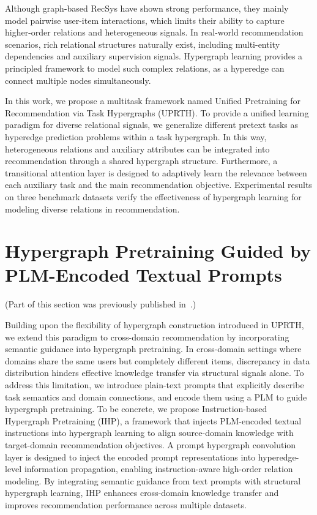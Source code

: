 Although graph-based RecSys have shown strong performance, they mainly model pairwise user-item interactions, which limits their ability to capture higher-order relations and heterogeneous signals. In real-world recommendation scenarios, rich relational structures naturally exist, including multi-entity dependencies and auxiliary supervision signals. Hypergraph learning provides a principled framework to model such complex relations, as a hyperedge can connect multiple nodes simultaneously.

In this work, we propose a multitask framework named Unified Pretraining for Recommendation via Task Hypergraphs (UPRTH). To provide a unified learning paradigm for diverse relational signals, we generalize different pretext tasks as hyperedge prediction problems within a task hypergraph. In this way, heterogeneous relations and auxiliary attributes can be integrated into recommendation through a shared hypergraph structure. Furthermore, a transitional attention layer is designed to adaptively learn the relevance between each auxiliary task and the main recommendation objective. Experimental results on three benchmark datasets verify the effectiveness of hypergraph learning for modeling diverse relations in recommendation.

\section{Hypergraph Pretraining Guided by PLM-Encoded Textual Prompts}
(Part of this section was previously published in~\cite{ihp}.)

Building upon the flexibility of hypergraph construction introduced in UPRTH, we extend this paradigm to cross-domain recommendation by incorporating semantic guidance into hypergraph pretraining. In cross-domain settings where domains share the same users but completely different items, discrepancy in data distribution hinders effective knowledge transfer via structural signals alone. To address this limitation, we introduce plain-text prompts that explicitly describe task semantics and domain connections, and encode them using a PLM to guide hypergraph pretraining. To be concrete, we propose Instruction-based Hypergraph Pretraining (IHP), a framework that injects PLM-encoded textual instructions into hypergraph learning to align source-domain knowledge with target-domain recommendation objectives. A prompt hypergraph convolution layer is designed to inject the encoded prompt representations into hyperedge-level information propagation, enabling instruction-aware high-order relation modeling. By integrating semantic guidance from text prompts with structural hypergraph learning, IHP enhances cross-domain knowledge transfer and improves recommendation performance across multiple datasets.

